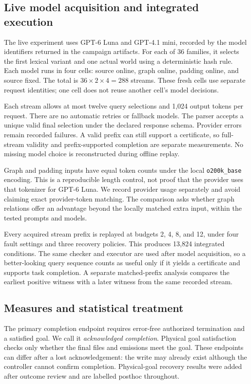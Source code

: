 \documentclass[conference]{IEEEtran}
\newcommand{\code}[1]{\texttt{#1}}
\begin{document}
\subsection{Live model acquisition and integrated execution}
The live experiment uses GPT-6 Luna and GPT-4.1 mini, recorded by the model identifiers returned in the campaign artifacts. For each of 36 families, it selects the first lexical variant and one actual world using a deterministic hash rule. Each model runs in four cells: source online, graph online, padding online, and source fixed. The total is $36\times2\times4=288$ streams. These fresh cells use separate request identities; one cell does not reuse another cell's model decisions.

Each stream allows at most twelve query selections and 1,024 output tokens per request. There are no automatic retries or fallback models. The parser accepts a unique valid final selection under the declared response schema. Provider errors remain recorded failures. A valid prefix can still support a certificate, so full-stream validity and prefix-supported completion are separate measurements. No missing model choice is reconstructed during offline replay.

Graph and padding inputs have equal token counts under the local \code{o200k\_base} encoding. This is a reproducible length control, not proof that the provider uses that tokenizer for GPT-6 Luna. We record provider usage separately and avoid claiming exact provider-token matching. The comparison asks whether graph relations offer an advantage beyond the locally matched extra input, within the tested prompts and models.

Every acquired stream prefix is replayed at budgets 2, 4, 8, and 12, under four fault settings and three recovery policies. This produces 13,824 integrated conditions. The same checker and executor are used after model acquisition, so a better-looking query sequence counts as useful only if it yields a certificate and supports task completion. A separate matched-prefix analysis compares the earliest positive witness with a later witness from the same recorded stream.

\subsection{Measures and statistical treatment}
The primary completion endpoint requires error-free authorized termination and a satisfied goal. We call it \emph{acknowledged completion}. Physical goal satisfaction checks only whether the final files and emissions meet the goal. These endpoints can differ after a lost acknowledgement: the write may already exist although the controller cannot confirm completion. Physical-goal recovery results were added after outcome review and are labelled posthoc throughout.
\end{document}
